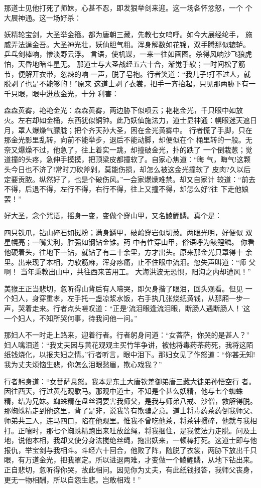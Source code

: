 那道士见他打死了师妹，心甚不忍，即发狠举剑来迎。这一场各怀忿怒，一个
个大展神通。这一场好杀：

妖精轮宝剑，大圣举金箍。都为唐朝三藏，先教七女呜呼。如今大展经纶手，
施威弄法逞金吾。大圣神光壮，妖仙胆气粗。浑身解数如花锦，双手腾那似辘轳。
乒乓剑棒响，惨淡野云浮。言语，使机谋，一来一往如画图。杀得风响沙飞狼虎
怕，天昏地暗斗星无。
那道士与大圣战经五六十合，渐觉手软；一时间松了筋节，便解开衣带，忽辣的响
一声，脱了皂袍。行者笑道：“我儿子!打不过人，就脱剥了也是不能够的！”原来
这道士剥了衣裳，把手一齐抬起，只见那两胁下有一千只眼，眼中迸放金光，十分
利害：

森森黄雾，艳艳金光：森森黄雾，两边胁下似喷云；艳艳金光，千只眼中如放
火。左右却如金桶，东西犹似铜钟。此乃妖仙施法力，道士显神通：幌眼迷天遮日
月，罩人爆燥气朦胧；把个齐天孙大圣，困在金光黄雾中。
行者慌了手脚，只在那金光影里乱转，向前不能举步，退后不能动脚，却便似在个
桶里转的一般。无奈又爆燥不过，他急了，往上着实一跳，却撞破金光，扑的跌了
一个倒栽葱；觉道撞的头疼，急伸手摸摸，把顶梁皮都撞软了。自家心焦道：“晦
气，晦气!这颗头今日也不济了!常时刀砍斧剁，莫能伤损，却怎么被这金光撞软了
皮肉?久以后定要贡脓。纵然好了，也是个破伤风。”一会家爆燥难禁。却又自家计
较道：“前去不得，后退不得，左行不得，右行不得，往上又撞不得，却怎么好?往
下走他娘罢！”

好大圣，念个咒语，摇身一变，变做个穿山甲，又名鲮鲤鳞。真个是：

四只铁爪，钻山碎石如挝粉；满身鳞甲，破岭穿岩似切葱。两眼光明，好便似
双星幌亮；一嘴尖利，胜强如钢钻金锥。药
中有性穿山甲，俗语呼为鲮鲤鳞。
你看他硬着头，往地下一钻，就钻了有二十余里，方才出头。原来那金光只罩得十
余里。出来现了本相，力软筋麻，浑身疼痛，止不住眼中流泪。忽失声叫道：“师
父啊！
当年秉教出山中，共往西来苦用工。
大海洪波无恐惧，阳沟之内却遭风！”

美猴王正当悲切，忽听得山背后有人啼哭，即欠身揩了眼泪，回头观看。但见
一个妇人，身穿重孝，左手托一盏凉浆水饭，右手执几张烧纸黄钱，从那厢一步一
声，哭着走来。行者点头嗟叹道：“正是‘流泪眼逢流泪眼，断肠人遇断肠人！’这
一个妇人，不知所哭何事，待我问他一问。”

那妇人不一时走上路来，迎着行者。行者躬身问道：“女菩萨，你哭的是甚人？”
妇人噙泪道：“我丈夫因与黄花观观主买竹竿争讲，被他将毒药茶药死，我将这陌
纸钱烧化，以报夫妇之情。”行者听言，眼中泪下。那妇女见了作怒道：“你甚无知!
我为丈夫烦恼生悲，你怎么泪眼愁眉，欺心戏我？”

行者躬身道：“女菩萨息怒。我本是东土大唐钦差御弟唐三藏大徒弟孙悟空行
者。因往西天，行过黄花观歇马。那观中道士，不知是个甚么妖精，他与七个蜘蛛
精，结为兄妹。蜘蛛精在盘丝洞要害我师父，是我与师弟八戒、沙僧，救解得脱。
那蜘蛛精走到他这里，背了是非，说我等有欺骗之意。道士将毒药茶药倒我师父、
师弟共三人，连马四口，陷在他观里。惟我不曾吃他茶，将茶钟掼碎，他就与我相
打。正嚷时，那七个蜘蛛精跑出来吐放丝绳，将我捆住，是我使法力走脱。问及土
地，说他本相，我却又使分身法搅绝丝绳，拖出妖来，一顿棒打死。这道士即与他
报仇，举宝剑与我相斗。斗经六十回合，他败了阵，随脱了衣裳，两胁下放出千只
眼，有万道金光，把我罩定。所以进退两难，才变做一个鲮鲤鳞，从地下钻出来。
正自悲切，忽听得你哭，故此相问。因见你为丈夫，有此纸钱报答，我师父丧身，
更无一物相酬，所以自怨生悲。岂敢相戏！”

